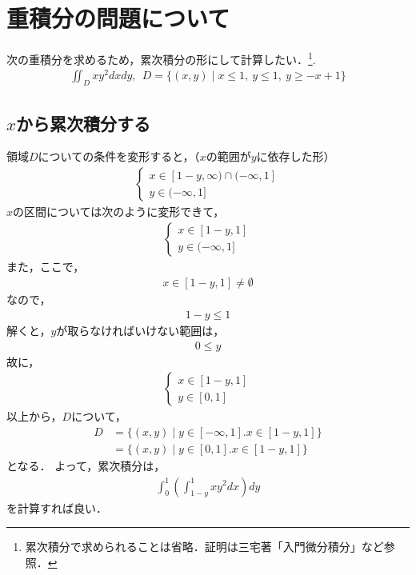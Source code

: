 \documentclass[12pt]{jarticle}
\date{}
\begin{document}
\section*{重積分の問題について}
次の重積分を求めるため，累次積分の形にして計算したい．\footnote{累次積分で求められることは省略．証明は三宅著「入門微分積分」など参照．}.
\begin{align*}
\iint_{D} x y^{2}  dxdy, \ \ D=\{(x, y) \mid x \le 1,\ y \le 1,\ y \ge -x + 1 \}
\end{align*}
%
\subsection*{$x$から累次積分する}
領域$D$についての条件を変形すると，（$x$の範囲が$y$に依存した形）
\begin{align*}
\left\{
	\begin{array}{ll}
	x \in [1-y, \infty) \cap (-\infty, 1] \\
	y \in (-\infty, 1]
	\end{array}
\right.
\end{align*}
$x$の区間については次のように変形できて，
\begin{align*}
\left\{
	\begin{array}{ll}
	x \in [1-y, 1] \\
	y \in (-\infty, 1]
	\end{array}
\right.
\end{align*}
また，ここで，
\begin{align*}
x \in [1-y,1] \neq \emptyset
\end{align*}
なので，
\begin{align*}
1-y \le 1
\end{align*}
解くと，$y$が取らなければいけない範囲は，
\begin{align*}
0 \le y
\end{align*}
故に，
\begin{align*}
\left\{
	\begin{array}{ll}
	x \in [1-y, 1] \\
	y \in [0, 1]
	\end{array}
\right.
\end{align*}
以上から，$D$について，
\begin{align*}
D &= \{(x,y) \mid y \in [-\infty, 1]. x \in [1-y,1] \} \\
&= \{(x,y) \mid y \in [0, 1]. x \in [1-y,1] \}
\end{align*}
となる．
よって，累次積分は，
\begin{align*}
\int_{0}^{1} \left( \int_{1-y}^{1} x y^{2} dx \right) dy
\end{align*}
を計算すれば良い．
%
%
%
%
\end{document}
